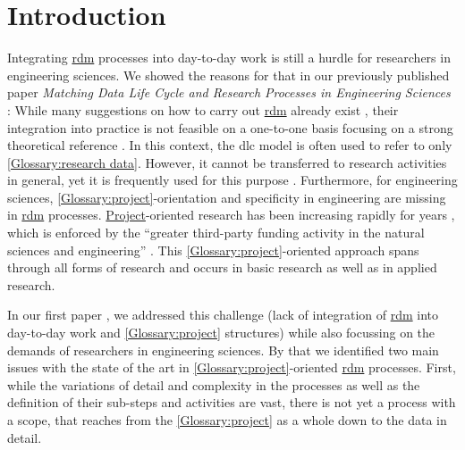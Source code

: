 \documentclass{bausteinefdm}
\begin{document}
\section{Introduction}
\label{Introduction}
Integrating \hyperref[Glossary:research data management level]{\ac{rdm}} processes into day-to-day work is still a hurdle for researchers in engineering sciences. \cite{Wuchner.2023, Ortloff.2023}
We showed the reasons for that in our previously published paper 
\textit{Matching Data Life Cycle and Research Processes in Engineering Sciences}
\cite{Hamann.2024b}: %
While many suggestions on how to carry out \hyperref[Glossary:research data management level]{\ac{rdm}} already exist \cite{ELIXIRCONVERGE.2023, Politze.2019, Higgins.2008}, 
their integration into practice is not feasible on a one-to-one basis focusing on a strong theoretical reference \cite{Cox.2018}.
In this context, the \ac{dlc} model is often used to refer to only \ref{Glossary:research data}. However, it cannot be transferred to research activities in general, yet it is frequently used for this purpose \cite{Hamann.2024b,Cox.2018}.
Furthermore, for engineering sciences, \ref{Glossary:project}-orientation and specificity in engineering are missing in \hyperref[Glossary:research data management level]{\ac{rdm}} processes. \hyperref[Glossary:project]{Project}-oriented research has been increasing rapidly for years 
\cite{Krull.2016, Winterhager.2015,Bonn.2009,Berning.2005}, which is enforced by the \enquote{greater third-party funding activity in the natural sciences and engineering} \cite{Berning.2005}.
This \ref{Glossary:project}-oriented approach spans through all forms of research and occurs in basic research as well as in applied research. \cite{Behlau.2017}


In our first paper \cite{Hamann.2024b}, we addressed this challenge (lack of integration of \hyperref[Glossary:research data management level]{\ac{rdm}} into day-to-day work and \ref{Glossary:project} structures) while also focussing on the demands of researchers in engineering sciences. 
By that we identified two main issues with the state of the art in \ref{Glossary:project}-oriented \hyperref[Glossary:research data management level]{\ac{rdm}} processes.
First, while the variations of detail and complexity in the processes as well as the definition of their sub-steps and activities are vast, there is not yet a process with a scope, that reaches from the \ref{Glossary:project} as a whole down to the data in detail.
\end{document}
